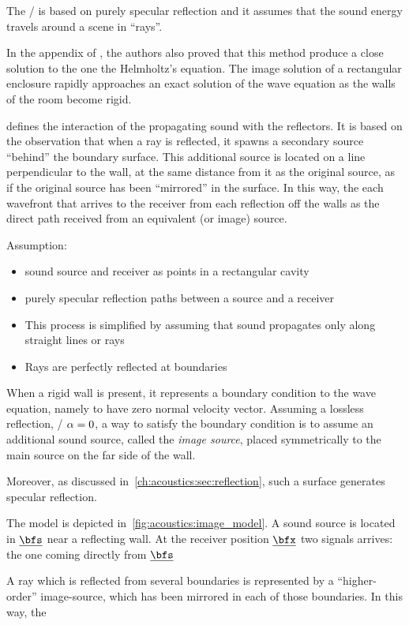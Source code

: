 The \ISM/ is based on purely specular reflection and it assumes that the sound energy travels around a scene in “rays”.

In the appendix of \cite{allen1979image}, the authors also proved that this method produce a close solution to the one the Helmholtz's equation.
The image solution of a rectangular enclosure
rapidly approaches an exact solution of the wave equation as the walls of the room become rigid.

 defines the interaction of the propagating sound with the reflectors.
It is based on the observation that when a ray is reflected, it spawns a secondary source “behind” the boundary surface.
This additional source is located on a line perpendicular to the wall, at the same distance from it as the original source, as if the original source has been “mirrored” in the surface.
In this way, the each wavefront that arrives to the receiver from each reflection off the walls as the direct path received from an equivalent (or image) source.

Assumption:
\begin{itemize}
    \item sound source and receiver as points in a rectangular cavity
    \item purely specular reflection paths between a source and a receiver
    \item This process is simplified by assuming that sound propagates only along straight lines or rays
    \item Rays are perfectly reflected at boundaries
\end{itemize}


When a rigid wall is present, it represents a boundary condition to the wave equation, namely to have zero normal velocity vector.
Assuming a lossless reflection, \ie/ $\alpha = 0$, a way to satisfy the boundary condition is to assume
an additional sound source, called the \textit{image source}, placed symmetrically to the main source on the far side of the wall.

Moreover, as discussed in~\cref{ch:acoustics:sec:reflection}, such a surface generates specular reflection.


The model is depicted in~\cref{fig:acoustics:image_model}.
A sound source is located in $\positionSource$ near a reflecting wall.
At the receiver position $\positionMicrophone$ two signals arrives: the one coming directly from $\positionSource$


A ray which is reflected from several boundaries is represented by a “higher-order” image-source,
which has been mirrored in each of those boundaries\cite{Kuttruff}. In this way, the


